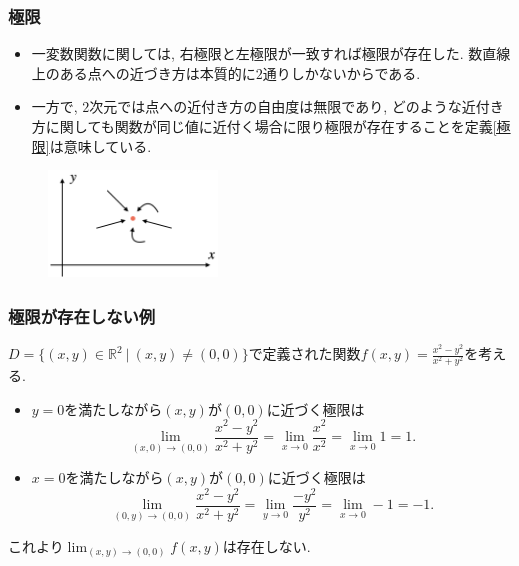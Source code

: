 \documentclass[dvipdfmx,cjk,10.2pt]{beamer}
\newcommand{\R}{\mathbb{R}}
\theoremstyle{definition}
\begin{document}


\begin{frame}
\frametitle{極限}


\begin{itemize}
\item 一変数関数に関しては, 右極限と左極限が一致すれば極限が存在した. 
数直線上のある点への近づき方は本質的に$2$通りしかないからである. 
\item 一方で, $2$次元では点への近付き方の自由度は無限であり, 
どのような近付き方に関しても関数が同じ値に近付く場合に限り極限が存在することを定義\ref{極限}は意味している. 
\end{itemize}

\vspace{-3mm}

\begin{figure}[htbp]
 \begin{center} 
  \includegraphics[width=45mm]{limit2d.png}
 \end{center}
\end{figure}

\vspace{-3mm}

\end{frame}




\begin{frame}
\frametitle{極限が存在しない例}

$D=\{(x,y) \in \R^2 \ | \ (x,y) \ne (0,0)\}$で定義された関数$f(x,y)=\frac{x^2-y^2}{x^2+y^2}$を考える. 

\begin{itemize}
\item $y=0$を満たしながら$(x,y)$が$(0,0)$に近づく極限は
$$
\lim_{(x,0)\to (0,0)} \frac{x^2-y^2}{x^2+y^2} 
=\lim_{x\to 0} \frac{x^2}{x^2}  =\lim_{x\to 0} 1=1. 
$$
\item $x=0$を満たしながら$(x,y)$が$(0,0)$に近づく極限は
$$
\lim_{(0,y)\to (0,0)} \frac{x^2-y^2}{x^2+y^2} 
=\lim_{y\to 0} \frac{-y^2}{y^2}  =\lim_{x\to 0} -1=-1. 
$$
\end{itemize}
これより$\displaystyle \lim_{(x,y)\to (0,0)}f(x,y)$は存在しない. 
\end{frame}
\end{document}
